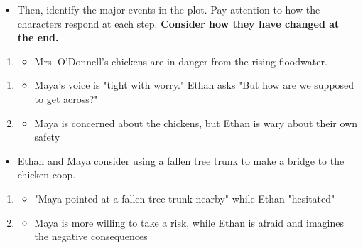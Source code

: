 \documentclass[12pt]{article}
\begin{document}
\begin{tcolorbox}[colframe=black!60, colback=white, 
coltitle=black, colbacktitle=black!15, fonttitle=\bfseries\Large, 
title=Examples, halign title=center, left=10pt, right=10pt, top=10pt, bottom=15pt]
\begin{itemize}
    \item Then, identify the major events in the plot. Pay attention to how the characters respond at each step. \textbf{Consider how they have changed at the end.}
\end{itemize}
   \begin{enumerate}
   \item
       \begin{itemize}
           \item Mrs. O'Donnell's chickens are in danger from the rising floodwater.
       \end{itemize}
   \end{enumerate}
       \begin{enumerate}
       \item
           \begin{itemize}
               \item Maya's voice is "tight with worry." Ethan asks "But how are we supposed to get across?"
           \end{itemize}
           \item
           \begin{itemize}
               \item Maya is concerned about the chickens, but Ethan is wary about their own safety 
           \end{itemize}
       \end{enumerate}
   \begin{itemize}
       \item Ethan and Maya consider using a fallen tree trunk to make a bridge to the chicken coop.
   \end{itemize}
       \begin{enumerate}
       \item
           \begin{itemize}
               \item "Maya pointed at a fallen tree trunk nearby" while Ethan "hesitated"
           \end{itemize}
           \item
           \begin{itemize}
               \item Maya is more willing to take a risk, while Ethan is afraid and imagines the negative consequences
           \end{itemize}
       \end{enumerate}
   \begin{itemize}

\end{itemize}
\end{tcolorbox}
\end{document}
